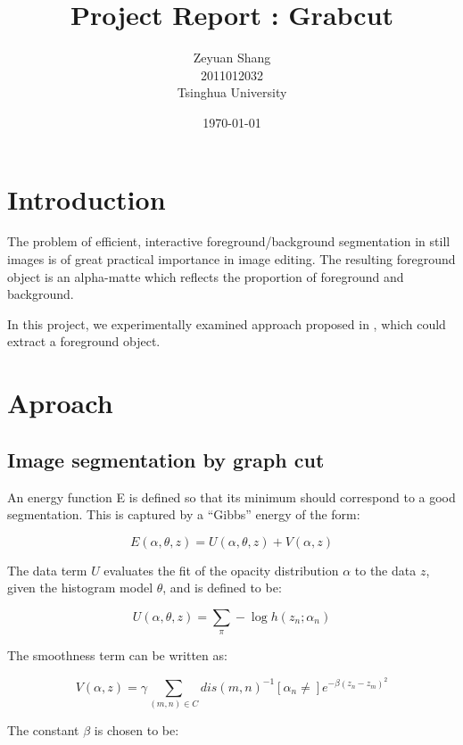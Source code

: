 \documentclass{article}
\begin{document}
\setlength{\parindent}{2em}
\linespread{1}

\title{Project Report : Grabcut}
\author{Zeyuan Shang \\ 2011012032 \\ Tsinghua University}
\date{\today}
\maketitle

\section{Introduction}
    
    The problem of efficient, interactive foreground/background segmentation in still images is of great practical importance in image editing. The resulting foreground object is an alpha-matte which reflects the proportion of foreground and background.

    In this project, we experimentally examined approach proposed in \cite{Rother}, which could  extract a foreground object.

\section{Aproach}

    \subsection{Image segmentation by graph cut}

        An energy function E is defined so that its minimum should correspond to a good segmentation. This is captured by a “Gibbs” energy of the form:
        
        $$E(\alpha, \theta, z) = U(\alpha, \theta, z) + V(\alpha, z)$$

        The data term $U$ evaluates the fit of the opacity distribution $\alpha$ to the data $z$, given the histogram model $\theta$, and is defined to be:

        $$U(\alpha, \theta, z) = \sum_{\pi} -\log{h(z_{n};\alpha_{n})}$$

        The smoothness term can be written as:

        $$V(\alpha, z) = \gamma \sum_{(m, n) \in C} dis(m, n)^{-1} [\alpha_{n} \not=] e^{-\beta (z_{n} - z_{m})^{2}}$$

        The constant $\beta$ is chosen to be:
\end{document}

